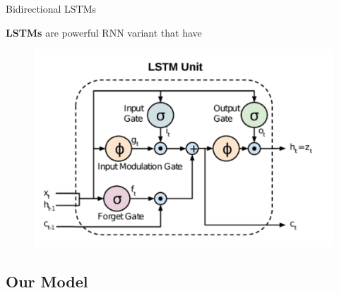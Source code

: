 \documentclass{beamer}
\newcommand{\<}				{\langle}
\renewcommand{\>}      		{\rangle}
\begin{document}
\begin{frame}{Bidirectional LSTMs} 

\textbf{LSTMs} are powerful RNN variant that have 

\begin{figure}[h]
\includegraphics[scale=0.5]{lstm.png}
\end{figure}

\end{frame}

\subsection{Our Model} 
\end{document}
